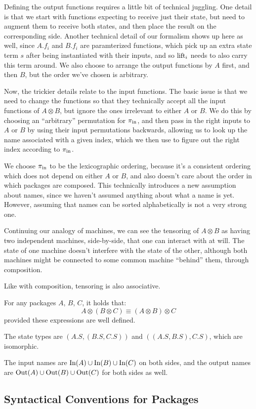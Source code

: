 Defining the output functions requires a little bit of technical juggling.
One detail is that we start with functions expecting to receive
just their state, but need to augment them to receive both states,
and then place the result on the corresponding side.
Another technical detail of our formalism shows up here as well,
since $A.f_i$ and $B.f_i$ are paramterized functions, which pick up
an extra state term $s$ after being instantiated with their inputs,
and so $\text{lift}_i$ needs to also carry this term around.
We also choose to arrange the output functions by $A$ first,
and then $B$, but the order we've chosen is arbitrary.

Now, the trickier details relate to the input functions.
The basic issue is that we need to change the functions so that
they technically accept all the input functions of $A \otimes B$,
but ignore the ones irrelevant to either $A$ or $B$.
We do this by choosing an ``arbitrary'' permutation for $\pi_{\text{in}}$,
and then pass in the right inputs to $A$ or $B$ by using
their input permutations backwards, allowing us to look up the name
associated with a given index,
which we then use to figure out the right index according to $\pi_{\text{in}}$.

We choose $\pi_{\text{in}}$ to be the lexicographic ordering,
because it's a consistent ordering which does not depend
on either $A$ or $B$, and also doesn't care about the order in which
packages are composed.
This technically introduces a new assumption about names, since we
haven't assumed anything about what a name is yet.
However, assuming that names can be sorted alphabetically is not
a very strong one.

Continuing our analogy of machines, we can see the tensoring of $A \otimes B$
as having two independent machines, side-by-side, that one can interact
with at will.
The state of one machine doesn't interfere with the state of the other,
although both machines might be connected to some common machine ``behind''
them, through composition.

Like with composition, tensoring is also associative.

\begin{lemma}
    For any packages $A$, $B$, $C$, it holds that:
    $$
    A \otimes (B \otimes C) \equiv (A \otimes B) \otimes C
    $$
    provided these expressions are well defined.

     The state types are $(A.S, (B.S, C.S))$
    and $((A.S, B.S), C.S)$, which are isomorphic.

    The input names are $\text{In}(A) \cup \text{In}(B) \cup \text{In}(C)$
    on both sides,
    and the output names are $\text{Out}(A) \cup \text{Out}(B) \cup \text{Out}(C)$
    for both sides as well.
\end{lemma}

\subsection{Syntactical Conventions for Packages}